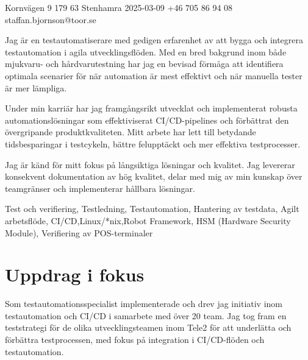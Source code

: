\documentclass{sobCV}[2015/09/08]
\begin{document}
       {Kornvägen 9}
       {179 63 Stenhamra}
       {2025-03-09}
       {+46 705 86 94 08} 
       {staffan.bjornson@toor.se}






   {
        Jag är en testautomatiserare med gedigen erfarenhet av att bygga och integrera testautomation i agila utvecklingsflöden. Med en bred bakgrund inom både mjukvaru- och hårdvarutestning har jag en bevisad förmåga att identifiera optimala scenarier för när automation är mest effektivt och när manuella tester är mer lämpliga.

        Under min karriär har jag framgångsrikt utvecklat och implementerat robusta automationslösningar som effektiviserat CI/CD-pipelines och förbättrat den övergripande produktkvaliteten. Mitt arbete har lett till betydande tidsbesparingar i testcykeln, bättre felupptäckt och mer effektiva testprocesser.

        Jag är känd för mitt fokus på långsiktiga lösningar och kvalitet. Jag levererar konsekvent dokumentation av hög kvalitet, delar med mig av min kunskap över teamgränser och implementerar hållbara lösningar.
   }{
        Test och verifiering,
        Testledning,
        Testautomation,
        Hantering av testdata,
        Agilt arbetsflöde,
        CI/CD,Linux/*nix,Robot Framework,
        HSM (Hardware Security Module),
        Verifiering av POS-terminaler
    }


\section{Uppdrag i fokus}
    Som testautomationsspecialist implementerade och drev jag initiativ inom testautomation och CI/CD i samarbete med över 20 team. Jag tog fram en teststrategi för de olika utvecklingsteamen inom Tele2 för att underlätta och förbättra testprocessen, med fokus på integration i CI/CD-flöden och testautomation.
\end{document}
